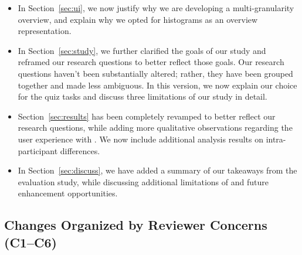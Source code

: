 {\begin{itemize}
for \noah more clearly
(\textbf{DC3})---focusing on motivating the binning
mechanism. 
\item In Section~\ref{sec:ui}, 
we now justify why we are developing a 
multi-granularity overview,
and explain why 
we opted for histograms as an overview representation. 
\item 
In Section~\ref{sec:study}, 
we further clarified the goals of our study
and reframed our research questions to 
better reflect those goals. 
Our research questions haven't been substantially altered;
rather, they have been grouped together and made less
ambiguous. In this version,
we now explain our choice
for the quiz tasks and discuss 
three limitations of our study in detail. 
\item Section~\ref{sec:results} has been completely
revamped to better reflect our research questions,
while adding more qualitative observations 
regarding the user experience with \noah. 
We now
include additional analysis results on intra-participant differences. 
\item In Section~\ref{sec:discuss}, we have added a summary of our takeaways from the evaluation study, while discussing additional limitations of \noah and future enhancement opportunities. 
\end{itemize}
\subsection*{Changes Organized by Reviewer Concerns (C1--C6)}
}

